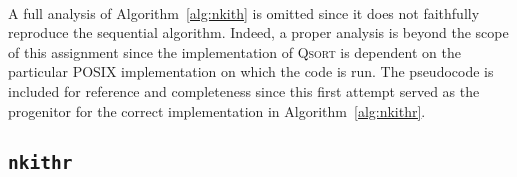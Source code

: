 \documentclass[11pt,epsf]{article}
\begin{document}
{{{\begin{algorithm}
\begin{algorithmic}
{{            }\ENDIF
            \ENDWHILE
            \ENDWHILE
            \ENDIF
            \ENDIF
          }\ENDWHILE
        \end{algorithmic}
      \end{algorithm}
    }
    \paragraph{}{
      A full analysis of Algorithm~\ref{alg:nkith} is omitted since it does not faithfully
      reproduce the sequential algorithm. Indeed, a proper analysis is beyond the scope of
      this assignment since the implementation of \textsc{Qsort} is dependent on the
      particular POSIX implementation on which the code is run. The pseudocode is included
      for reference and completeness since this first attempt served as the progenitor for
      the correct implementation in Algorithm~\ref{alg:nkithr}.
    }
  }

  \subsection{\texttt{nkithr}}{
}}
\end{document}
